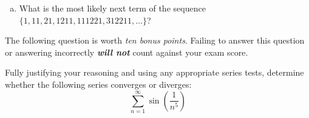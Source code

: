 \documentclass[12pt,letterpaper]{exam}
\begin{document}
\begin{questions}
\begin{enumerate}[(a)]
	\item What is the most likely next term of the sequence $\{ 1, 11, 21, 1211, 111221, 312211, \ldots \}$? \par\vspace{0.5cm} \underline{ \hspace{2cm} \phantom{$13112221$} \hspace{2cm}}
	\end{enumerate} \par\vspace{0.5cm}
	
 The following question is worth \textit{ten bonus points}. Failing to answer this question or answering incorrectly \textit{\bfseries will not} count against your exam score. \par\vspace{0.3cm} 

Fully justifying your reasoning and using any appropriate series tests, determine whether the following series converges or diverges:	
	\[
	\sum_{n=1}^\infty \sin \left( \dfrac{1}{n^5} \right)
	\] 

\end{questions}
\end{document}
